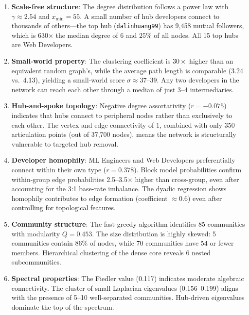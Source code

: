 \documentclass[letterpaper]{article}
\begin{document}
\begin{enumerate}
  \item \textbf{Scale-free structure}: The degree distribution follows a power law with $\gamma \approx 2.54$ and $x_{\min} = 55$. A small number of hub developers connect to thousands of others---the top hub (\texttt{dalinhuang99}) has 9,458 mutual followers, which is 630$\times$ the median degree of 6 and $25\%$ of all nodes. All 15 top hubs are Web Developers.

  \item \textbf{Small-world property}: The clustering coefficient is $30\times$ higher than an equivalent random graph's, while the average path length is comparable (3.24 vs.\ 4.13), yielding a small-world score $\sigma \approx 37$--39. Any two developers in the network can reach each other through a median of just 3--4 intermediaries.

  \item \textbf{Hub-and-spoke topology}: Negative degree assortativity ($r = -0.075$) indicates that hubs connect to peripheral nodes rather than exclusively to each other. The vertex and edge connectivity of 1, combined with only 350 articulation points (out of 37,700 nodes), means the network is structurally vulnerable to targeted hub removal.

  \item \textbf{Developer homophily}: ML Engineers and Web Developers preferentially connect within their own type ($r = 0.378$). Block model probabilities confirm within-group edge probabilities 2.5--3.5$\times$ higher than cross-group, even after accounting for the 3:1 base-rate imbalance. The dyadic regression shows homophily contributes to edge formation (coefficient $\approx 0.6$) even after controlling for topological features.

  \item \textbf{Community structure}: The fast-greedy algorithm identifies 85 communities with modularity $Q = 0.453$. The size distribution is highly skewed: 5 communities contain 86\% of nodes, while 70 communities have 54 or fewer members. Hierarchical clustering of the dense core reveals 6 nested subcommunities.

  \item \textbf{Spectral properties}: The Fiedler value (0.117) indicates moderate algebraic connectivity. The cluster of small Laplacian eigenvalues (0.156--0.199) aligns with the presence of 5--10 well-separated communities. Hub-driven eigenvalues dominate the top of the spectrum.


\end{enumerate}
\end{document}

